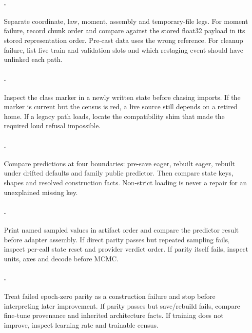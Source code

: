 \paragraph{.}
Separate coordinate, law, moment, assembly and temporary-file legs.  For
moment failure, record chunk order and compare against the stored float32
payload in its stored representation order.  Pre-cast data uses the wrong
reference.  For cleanup failure, list live train and
validation slots and which restaging event should have unlinked each path.

\paragraph{.}
Inspect the class marker in a newly written state before chasing imports.  If
the marker is current but the census is red, a live source still depends on a
retired home.  If a legacy path loads, locate the compatibility shim that made
the required loud refusal impossible.

\paragraph{.}
Compare predictions at four boundaries: pre-save eager, rebuilt eager,
rebuilt under drifted defaults and family public predictor.  Then compare
state keys, shapes and resolved construction facts.  Non-strict loading is
never a repair for an unexplained missing key.

\paragraph{.}
Print named sampled values in artifact order and compare the predictor result
before adapter assembly.  If direct parity passes but repeated sampling fails,
inspect per-call state reset and provider verdict order.  If parity itself
fails, inspect units, axes and decode before MCMC.

\paragraph{.}
Treat failed epoch-zero parity as a construction failure and stop before
interpreting later improvement.  If parity passes but save/rebuild fails,
compare fine-tune provenance and inherited architecture facts.  If training
does not improve, inspect learning rate and trainable census.

